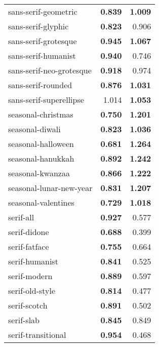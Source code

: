 \begin{longtable}{|l|r|r|}
sans-serif-geometric      & \textbf{0.839}             & \textbf{1.009}          \\
sans-serif-glyphic        & \textbf{0.823}             & 0.906                   \\
sans-serif-grotesque      & \textbf{0.945}             & \textbf{1.067}          \\
sans-serif-humanist       & \textbf{0.940}             & 0.746                   \\
sans-serif-neo-grotesque  & \textbf{0.918}             & 0.974                   \\
sans-serif-rounded        & \textbf{0.876}             & \textbf{1.031}          \\
sans-serif-superellipse   & 1.014                      & \textbf{1.053}          \\
seasonal-christmas        & \textbf{0.750}             & \textbf{1.201}          \\
seasonal-diwali           & \textbf{0.823}             & \textbf{1.036}          \\
seasonal-halloween        & \textbf{0.681}             & \textbf{1.264}          \\
seasonal-hanukkah         & \textbf{0.892}             & \textbf{1.242}          \\
seasonal-kwanzaa          & \textbf{0.866}             & \textbf{1.222}          \\
seasonal-lunar-new-year   & \textbf{0.831}             & \textbf{1.207}          \\
seasonal-valentines       & \textbf{0.729}             & \textbf{1.018}          \\
serif-all                 & \textbf{0.927}             & 0.577                   \\
serif-didone              & \textbf{0.688}             & 0.399                   \\
serif-fatface             & \textbf{0.755}             & 0.664                   \\
serif-humanist            & \textbf{0.841}             & 0.525                   \\
serif-modern              & \textbf{0.889}             & 0.597                   \\
serif-old-style           & \textbf{0.814}             & 0.477                   \\
serif-scotch              & \textbf{0.891}             & 0.502                   \\
serif-slab                & \textbf{0.845}             & 0.849                   \\
serif-transitional        & \textbf{0.954}             & 0.468                  

\end{longtable}